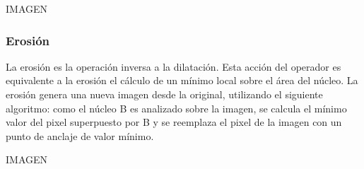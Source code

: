 IMAGEN

\subsubsection{Erosión}
La erosión es la operación inversa a la dilatación. Esta acción del operador es equivalente a la erosión el cálculo de un mínimo local sobre el área del núcleo. La erosión genera una nueva imagen desde la original, utilizando el siguiente algoritmo: como el núcleo B es analizado sobre la imagen, se calcula el mínimo valor del pixel superpuesto por B y se reemplaza el pixel de la imagen con un punto de anclaje de valor mínimo. 

IMAGEN
